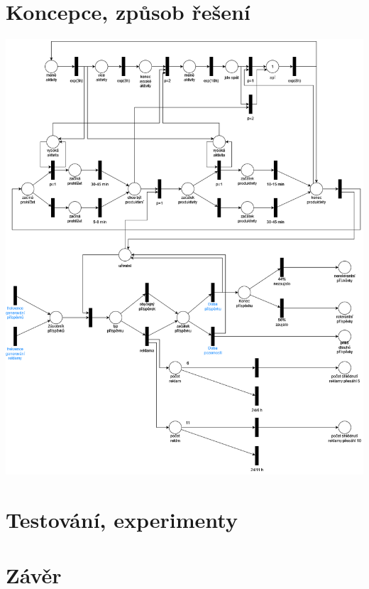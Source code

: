 \documentclass[11pt, a4paper]{article}
\begin{document}
\section{Koncepce, způsob řešení}

\vspace{1em}
\includegraphics[width=\linewidth]{petri-net.png}
\vspace{1em}

\section{Testování, experimenty}

\section{Závěr}



    
\end{document}
